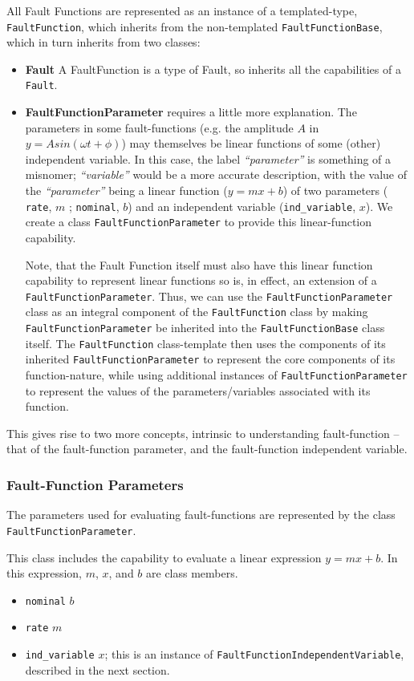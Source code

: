 \documentclass[11pt,fleqn]{report}
\begin{document}
All Fault Functions are represented as an instance of a templated-type,
\verb'FaultFunction', which inherits from the non-templated
\verb'FaultFunctionBase', which in turn inherits from two classes:
\begin{itemize}
\item \textbf{Fault} A FaultFunction is a type of Fault, so inherits all the
capabilities of a \verb'Fault'.
\item \textbf{FaultFunctionParameter} requires a little more explanation.
The parameters in some fault-functions (e.g. the
amplitude $A$ in $y=A sin(\omega t + \phi)$) may themselves be linear
functions of some (other) independent variable. In this case, the label
\textit{``parameter''} is something of a misnomer; \textit{``variable''}
would be a more accurate description, with the value of the
\textit{``parameter''} being a
linear function ($y=mx+b$) of two parameters (
\verb'rate', $m$ ;  \verb'nominal', $b$) and an independent variable
(\verb'ind_variable', $x$). We create a class \verb'FaultFunctionParameter'
to provide this linear-function capability.

Note, that the Fault Function itself must also have this linear
function capability to represent linear functions so is, in effect, an
extension of a \verb'FaultFunctionParameter'. Thus, we can use the
\verb'FaultFunctionParameter' class as an integral component of the
\verb'FaultFunction' class by making \verb'FaultFunctionParameter' be
inherited into the \verb'FaultFunctionBase' class itself. The
\verb'FaultFunction' class-template then uses the components of its inherited
\verb'FaultFunctionParameter' to represent the core components of its
function-nature, while using additional instances of
\verb'FaultFunctionParameter' to
represent the values of the parameters/variables associated with its function.
\end{itemize}
This gives rise to two more concepts, intrinsic to understanding fault-function
-- that of the fault-function parameter, and the fault-function independent
variable.



\subsubsection{Fault-Function Parameters} \label{sec:formulation:concept:params}
The parameters used for evaluating fault-functions are
represented by the class \verb'FaultFunctionParameter'.

This class includes the capability to evaluate a linear expression $y=mx+b$. In
this expression, $m$, $x$, and $b$ are class members.
\begin{itemize}
 \item \verb'nominal' $b$
 \item \verb'rate' $m$
 \item \verb'ind_variable' $x$; this is an instance of
   \verb'FaultFunctionIndependentVariable', described in the next section.
\end{itemize}
\end{document}
